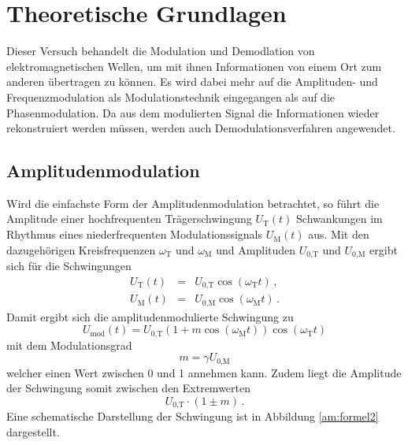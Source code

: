 \section{Theoretische Grundlagen}
\label{sec:theorie}

Dieser Versuch behandelt die Modulation und Demodlation von elektromagnetischen Wellen, um mit ihnen Informationen von einem Ort
zum anderen übertragen zu können.
Es wird dabei mehr auf die Amplituden- und Frequenzmodulation als Modulationstechnik eingegangen als auf die Phasenmodulation.
Da aus dem modulierten Signal die Informationen wieder rekonstruiert werden müssen, werden auch Demodulationsverfahren angewendet.

\subsection{Amplitudenmodulation}
\label{subsec:klassisch}

Wird die einfachste Form der Amplitudenmodulation betrachtet, so führt die Amplitude einer hochfrequenten Trägerschwingung $U_\text{T}(t)$ Schwankungen im Rhythmus eines niederfrequenten Modulationssignals $U_\text{M}(t)$ aus.
Mit den dazugehörigen Kreisfrequenzen $\omega_\text{T}$ und $\omega_\text{M}$ und Amplituden $U_\text{0,T}$ und $U_\text{0,M}$ ergibt sich für die Schwingungen
\begin{eqnarray*}
    U_\text{T}(t) &=& U_\text{0,T} \cos{\left(\omega_\text{T} t\right)}\, , \\
    U_\text{M}(t) &=& U_\text{0,M} \cos{\left(\omega_\text{M} t \right)}\, .
\end{eqnarray*}
Damit ergibt sich die amplitudenmodulierte Schwingung zu
\begin{equation}
    U_\text{mod}(t) = U_\text{0,T} ( 1 + m \cos{\left( \omega_\text{M} t \right)} ) \cos{\left(\omega_\text{T} t\right)} \label{am:formel1}
\end{equation}
mit dem Modulationsgrad
\begin{equation}
    m = \gamma U_\text{0,M}
\end{equation}
welcher einen Wert zwischen 0 und 1 annehmen kann.
Zudem liegt die Amplitude der Schwingung somit zwischen den Extremwerten
\begin{equation}
    U_\text{0,T} \cdot (1 \pm m)\,.
\end{equation}
Eine schematische Darstellung der Schwingung ist in Abbildung \ref{am:formel2} dargestellt.

